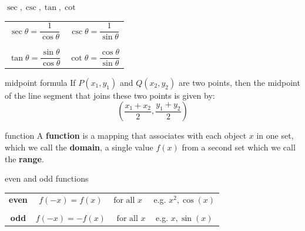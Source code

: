 \documentclass[avery5371,grid]{flashcards}
\begin{document}
\begin{flashcard}[Definition]{$\sec, \csc, \tan, \cot$}
\begin{center}
\begin{tabular}{cc}
$\sec \theta = \dfrac{1}{\cos \theta}$ &
$\csc \theta = \dfrac{1}{\sin \theta}$\\
 & \\
 & \\
$\tan \theta = \dfrac{\sin \theta}{\cos \theta}$ &
$\cot \theta = \dfrac{\cos \theta}{\sin \theta}$\\
\end{tabular} 
\end{center}
\end{flashcard}

\begin{flashcard}[Definition]{midpoint formula}
If $P(x_{1}, y_{1})$ and $Q(x_{2}, y_{2})$ are two points, then 
the midpoint of the line segment that joins these two points
is given by:
\begin{equation*}
\left( \dfrac{x_{1}+x_{2}}{2}, \dfrac{y_{1}+y_{2}}{2}\right) 
\end{equation*}
\end{flashcard}

\begin{flashcard}[Definition]{function}
A \textbf{function} is a mapping that associates with each object $x$ in one
set, which we call the \textbf{domain}, a single value $f(x)$ from a second set
which we call the \textbf{range}.
\end{flashcard}

\begin{flashcard}[Definition]{even and odd functions}
\begin{tabular}{ccc}
\textbf{even} & $f(-x) = f(x) \quad \text{ for all } x$ & e.g. $x^{2}, \cos(x)$\\
\\
\textbf{odd} & $f(-x) =  -f(x) \quad \text{ for all } x$ & e.g. $x, \sin(x)$\\
\end{tabular} 
\end{flashcard}
\end{document}
